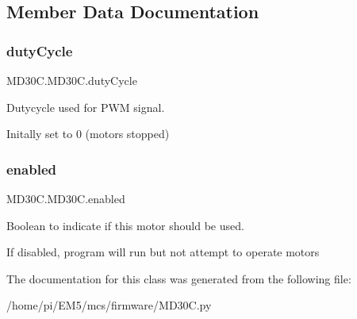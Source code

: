 \subsection{Member Data Documentation}
\mbox{\label{classMD30C_1_1MD30C_a967e0eb653d2ebb742863f77dd77ff1e}} 
\subsubsection{\texorpdfstring{duty\+Cycle}{dutyCycle}}
{\footnotesize\ttfamily M\+D30\+C.\+M\+D30\+C.\+duty\+Cycle}



Dutycycle used for P\+WM signal. 

Initally set to 0 (motors stopped) \mbox{\label{classMD30C_1_1MD30C_a8f7dea57c9f54fc9e3235b22d3c01e56}} 
\subsubsection{\texorpdfstring{enabled}{enabled}}
{\footnotesize\ttfamily M\+D30\+C.\+M\+D30\+C.\+enabled}



Boolean to indicate if this motor should be used. 

If disabled, program will run but not attempt to operate motors 

The documentation for this class was generated from the following file\+:\begin{DoxyCompactItemize}
\item 
/home/pi/\+E\+M5/mcs/firmware/M\+D30\+C.\+py\end{DoxyCompactItemize}
